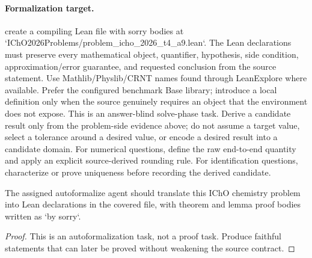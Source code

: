 \paragraph{Formalization target.}
create a compiling Lean file with sorry bodies at `IChO2026Problems/problem\_icho\_2026\_t4\_a9.lean`.
The Lean declarations must preserve every mathematical object, quantifier, hypothesis, side condition, approximation/error guarantee, and requested conclusion from the source statement.
Use Mathlib/Physlib/CRNT names found through LeanExplore where available. Prefer the configured benchmark Base library; introduce a local definition only when the source genuinely requires an object that the environment does not expose.
This is an answer-blind solve-phase task. Derive a candidate result only from the problem-side evidence above; do not assume a target value, select a tolerance around a desired value, or encode a desired result into a candidate domain.
For numerical questions, define the raw end-to-end quantity and apply an explicit source-derived rounding rule. For identification questions, characterize or prove uniqueness before recording the derived candidate.

\begin{theorem}
\label{thm:physics:icho_2026_t4_a9:target}
The assigned autoformalize agent should translate this IChO chemistry problem into Lean declarations in the covered file, with theorem and lemma proof bodies written as `by sorry`.
\end{theorem}
\begin{proof}
This is an autoformalization task, not a proof task. Produce faithful statements that can later be proved without weakening the source contract.
\end{proof}
